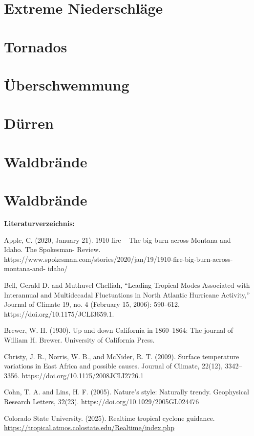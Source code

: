 \documentclass[12pt,paper=a4,DIV=12,parskip=never,chapterprefix=false,headings=standardclasses]{scrreprt}
\begin{document}
\section{Extreme Niederschläge}
\section{Tornados}
\section{Überschwemmung}
\section{Dürren}
\section{Waldbrände}
\section{Waldbrände}

\vfill
\noindent\textbf{Literaturverzeichnis:}

\begingroup
\parindent=0pt
\everypar{\hangindent=2em\hangafter=1\relax}

Apple, C. (2020, January 21). 1910 fire – The big burn across Montana and Idaho. The Spokesman-
Review. https://www.spokesman.com/stories/2020/jan/19/1910-fire-big-burn-across-montana-and-
idaho/

Bell, Gerald D. and Muthuvel Chelliah, “Leading Tropical Modes Associated with Interannual and
Multidecadal Fluctuations in North Atlantic Hurricane Activity,” Journal of Climate 19, no. 4
(February 15, 2006): 590–612, https://doi.org/10.1175/JCLI3659.1.

Brewer, W. H. (1930). Up and down California in 1860–1864: The journal of William H. Brewer.
University of California Press.

Christy, J. R., Norris, W. B., and McNider, R. T. (2009). Surface temperature variations in East Africa
and possible causes. Journal of Climate, 22(12), 3342–3356. https://doi.org/10.1175/2008JCLI2726.1

Cohn, T. A. and Lins, H. F. (2005). Nature’s style: Naturally trendy. Geophysical Research Letters,
32(23). https://doi.org/10.1029/2005GL024476

Colorado State University. (2025). Realtime tropical cyclone guidance.
\url{https://tropical.atmos.colostate.edu/Realtime/index.php}
\end{document}
